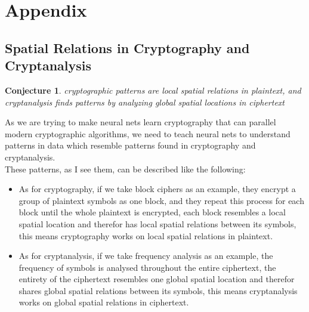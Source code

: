 \documentclass[a4paper, 12pt]{report}
\newtheorem{conjecture}{Conjecture}
\begin{document}
\chapter*{Appendix}
\section*{\textbf{Spatial Relations in Cryptography and Cryptanalysis}}\label{appendix:1}
\begin{conjecture}
	 cryptographic patterns are local spatial relations in plaintext, and cryptanalysis finds patterns by analyzing global spatial locations in ciphertext
\end{conjecture}
As we are trying to make neural nets learn cryptography that can parallel modern cryptographic algorithms, we need to teach neural nets to understand patterns in data which resemble patterns found in cryptography and cryptanalysis.\\
These patterns, as I see them, can be described like the following:
\begin{itemize}
	\item As for cryptography, if we take block ciphers as an example, they encrypt a group of plaintext symbols as one block, and they repeat this process for each block until the whole plaintext is encrypted, each block resembles a local spatial location and therefor has local spatial relations between its symbols, this means cryptography works on local spatial relations in plaintext.
	\item As for cryptanalysis, if we take frequency analysis as an example, the frequency of symbols is analysed throughout the entire ciphertext, the entirety of the ciphertext resembles one global spatial location and therefor shares global spatial relations between its symbols, this means cryptanalysis works on global spatial relations in ciphertext.
\end{itemize}
\newpage
\end{document}
